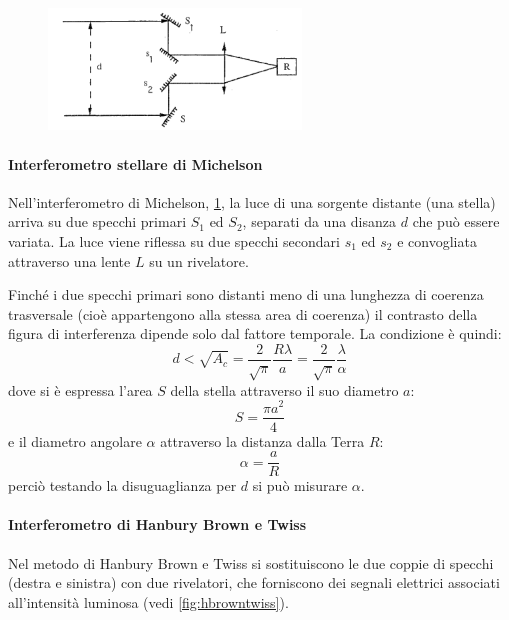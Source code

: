 \begin{figure}[b]
	\centering
	\includegraphics[width=0.6\textwidth]{Immagini/StellarMichelson.png}
	\vspace{-10pt}
	\caption{}
	\label{fig:michelsonst}
	\vspace{-10pt}
\end{figure}

\paragraph{Interferometro stellare di Michelson} Nell'interferometro di Michelson, \cref{fig:michelsonst}, la luce di una sorgente distante (una stella) arriva su due specchi primari $ S_1$ ed $ S_2 $, separati da una disanza $ d $ che può essere variata. La luce viene riflessa su due specchi secondari $ s_1$ ed $ s_2 $ e convogliata attraverso una lente $ L $ su  un rivelatore.

Finché i due specchi primari sono distanti meno di una lunghezza di coerenza trasversale (cioè appartengono alla stessa area di coerenza) il contrasto della figura di interferenza dipende solo dal fattore temporale. La condizione è quindi:
\[ d < \sqrt{A_c} = \frac{2}{\sqrt{\pi}}\frac{R \lambda}{a} = \frac{2}{\sqrt{\pi}}\frac{\lambda}{\alpha} \]
dove si è espressa l'area $ S $ della stella attraverso il suo diametro $ a $:
\[ S = \frac{\pi a^2}{4} \]
e il diametro angolare $ \alpha $ attraverso la distanza dalla Terra $ R $:
\[ \alpha = \frac{a}{R} \]
perciò testando la disuguaglianza per $ d $ si può misurare $ \alpha $.

\paragraph{Interferometro di Hanbury Brown e Twiss} Nel metodo di Hanbury Brown e Twiss si sostituiscono le due coppie di specchi (destra e sinistra) con due rivelatori, che forniscono dei segnali elettrici associati all'intensità luminosa (vedi \cref{fig:hbrowntwiss}).

